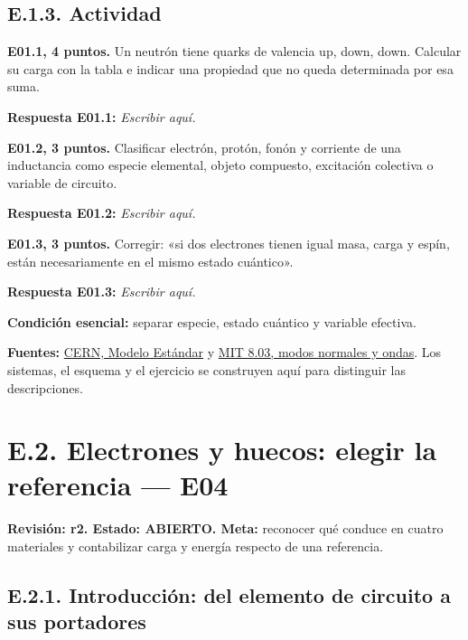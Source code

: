 \documentclass[
  spanish,
  10pt,
  a4paper,
]{article}
\begin{document}
\subsection{E.1.3. Actividad}\label{e.1.3.-actividad}


\textbf{E01.1, 4 puntos.} Un neutrón tiene quarks de valencia up, down,
down. Calcular su carga con la tabla e indicar una propiedad que no
queda determinada por esa suma.

\textbf{Respuesta E01.1:} \emph{Escribir aquí.}


\textbf{E01.2, 3 puntos.} Clasificar electrón, protón, fonón y corriente
de una inductancia como especie elemental, objeto compuesto, excitación
colectiva o variable de circuito.

\textbf{Respuesta E01.2:} \emph{Escribir aquí.}


\textbf{E01.3, 3 puntos.} Corregir: «si dos electrones tienen igual
masa, carga y espín, están necesariamente en el mismo estado cuántico».

\textbf{Respuesta E01.3:} \emph{Escribir aquí.}

\textbf{Condición esencial:} separar especie, estado cuántico y variable
efectiva.

\textbf{Fuentes:}
\href{https://home.cern/science/physics/standard-model/}{CERN, Modelo
Estándar} y
\href{https://ocw.mit.edu/courses/8-03sc-physics-iii-vibrations-and-waves-fall-2016/}{MIT
8.03, modos normales y ondas}. Los sistemas, el esquema y el ejercicio
se construyen aquí para distinguir las descripciones.


\bigskip

\section{E.2. Electrones y huecos: elegir la referencia ---
E04}\label{e.2.-electrones-y-huecos-elegir-la-referencia-e04}

\textbf{Revisión: r2. Estado: ABIERTO. Meta:} reconocer qué conduce en
cuatro materiales y contabilizar carga y energía respecto de una
referencia.

\subsection{E.2.1. Introducción: del elemento de circuito a sus
portadores}\label{e.2.1.-introducciuxf3n-del-elemento-de-circuito-a-sus-portadores}
\end{document}
